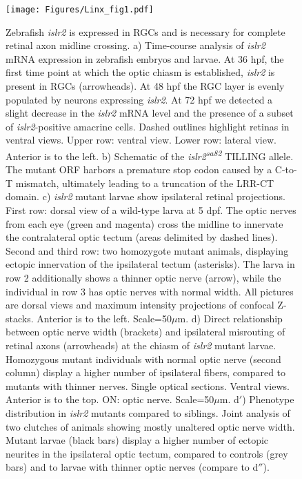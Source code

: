 \begin{figure}[hbtp]
    \begin{center}
        \texttt{[image: Figures/Linx\_fig1.pdf]}
        \caption[Zebrafish \emph{islr2} is expressed in RGCs and is necessary for complete retinal axon midline crossing.]
        {Zebrafish \emph{islr2} is expressed in RGCs and is necessary for complete retinal axon midline crossing.
		a) Time-course analysis of \emph{islr2} mRNA expression in zebrafish embryos and larvae.
		At 36 hpf, the first time point at which the optic chiasm is established, \emph{islr2} is present in RGCs (arrowheads).
		At 48 hpf the RGC layer is evenly populated by neurons expressing \emph{islr2}.
		At 72 hpf we detected a slight decrease in the \emph{islr2} mRNA level and the presence of a subset of \emph{islr2}-positive amacrine cells.
		Dashed outlines highlight retinas in ventral views.
		Upper row: ventral view.
		Lower row: lateral view.
		Anterior is to the left.
		b) Schematic of the \emph{islr2\textsuperscript{sa82}} TILLING allele.
		The mutant ORF harbors a premature stop codon caused by a C-to-T mismatch, ultimately leading to a truncation of the LRR-CT domain.
		c) \emph{islr2} mutant larvae show ipsilateral retinal projections.
		First row: dorsal view of a wild-type larva at 5 dpf.
		The optic nerves from each eye (green and magenta) cross the midline to innervate the contralateral optic tectum (areas delimited by dashed lines).
		Second and third row: two homozygote mutant animals, displaying ectopic innervation of the ipsilateral tectum (asterisks).
		The larva in row 2 additionally shows a thinner optic nerve (arrow), while the individual in row 3 has optic nerves with normal width.
		All pictures are dorsal views and maximum intensity projections of confocal Z-stacks.
		Anterior is to the left.
		Scale=50$\mu$m.
		d) Direct relationship between optic nerve width (brackets) and ipsilateral misrouting of retinal axons (arrowheads) at the chiasm of \emph{islr2} mutant larvae.
		Homozygous mutant individuals with normal optic nerve (second column) display a higher number of ipsilateral fibers, compared to mutants with thinner nerves.
		Single optical sections.
		Ventral views.
		Anterior is to the top.
		ON: optic nerve.
		Scale=50$\mu$m. 
		d$'$) Phenotype distribution in \emph{islr2} mutants compared to siblings.
		Joint analysis of two clutches of animals showing mostly unaltered optic nerve width.
		Mutant larvae (black bars) display a higher number of ectopic neurites in the ipsilateral optic tectum, compared to controls (grey bars) and to larvae with thinner optic nerves (compare to d$''$).
}
\end{center}
\end{figure}
